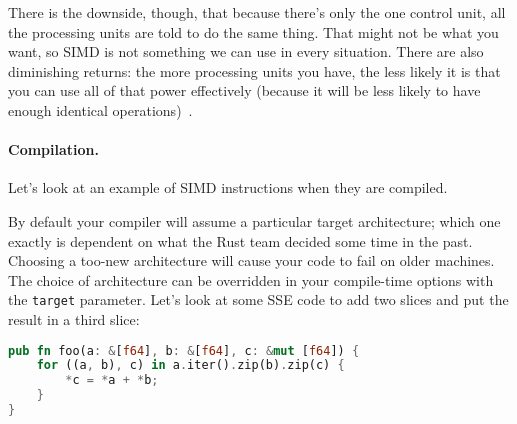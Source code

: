 There is the downside, though, that because there's only the one control unit, all the processing units are told to do the same thing. That might not be what you want, so SIMD is not something we can use in every situation. There are also diminishing returns: the more processing units you have, the less likely it is that you can use all of that power effectively (because it will be less likely to have enough identical operations)~\cite{sse}.

\paragraph{Compilation.} Let's look at an example of SIMD instructions when they are compiled.

By default your compiler will assume a particular target architecture; which one exactly is dependent on what the Rust team decided some time in the past. Choosing a too-new architecture will cause your code to fail on older machines. The choice of architecture can be overridden in your compile-time options with the \texttt{target} parameter. Let's look at some SSE code to add two slices and put the result in a third slice:

\begin{lstlisting}[language=Rust]
pub fn foo(a: &[f64], b: &[f64], c: &mut [f64]) {
    for ((a, b), c) in a.iter().zip(b).zip(c) {
        *c = *a + *b;
    }
}\end{lstlisting}


